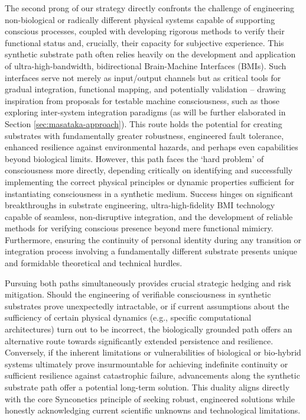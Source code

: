 \documentclass[10pt]{article}
\begin{document}
\begin{sloppypar}
  The second prong of our strategy directly confronts the challenge of engineering non-biological or radically different physical systems capable of supporting conscious processes, coupled with developing rigorous methods to verify their functional status and, crucially, their capacity for subjective experience. This synthetic substrate path often relies heavily on the development and application of ultra-high-bandwidth, bidirectional Brain-Machine Interfaces (BMIs). Such interfaces serve not merely as input/output channels but as critical tools for gradual integration, functional mapping, and potentially validation – drawing inspiration from proposals for testable machine consciousness, such as those exploring inter-system integration paradigms (as will be further elaborated in Section \ref{sec:masataka-approach}). This route holds the potential for creating substrates with fundamentally greater robustness, engineered fault tolerance, enhanced resilience against environmental hazards, and perhaps even capabilities beyond biological limits. However, this path faces the ‘hard problem’ of consciousness more directly, depending critically on identifying and successfully implementing the correct physical principles or dynamic properties sufficient for instantiating consciousness in a synthetic medium. Success hinges on significant breakthroughs in substrate engineering, ultra-high-fidelity BMI technology capable of seamless, non-disruptive integration, and the development of reliable methods for verifying conscious presence beyond mere functional mimicry. Furthermore, ensuring the continuity of personal identity during any transition or integration process involving a fundamentally different substrate presents unique and formidable theoretical and technical hurdles.

  Pursuing both paths simultaneously provides crucial strategic hedging and risk mitigation. Should the engineering of verifiable consciousness in synthetic substrates prove unexpectedly intractable, or if current assumptions about the sufficiency of certain physical dynamics (e.g., specific computational architectures) turn out to be incorrect, the biologically grounded path offers an alternative route towards significantly extended persistence and resilience. Conversely, if the inherent limitations or vulnerabilities of biological or bio-hybrid systems ultimately prove insurmountable for achieving indefinite continuity or sufficient resilience against catastrophic failure, advancements along the synthetic substrate path offer a potential long-term solution. This duality aligns directly with the core Synconetics principle of seeking robust, engineered solutions while honestly acknowledging current scientific unknowns and technological limitations.


\end{sloppypar}
\end{document}

